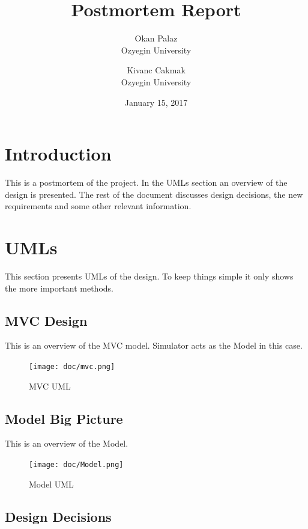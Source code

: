 \documentclass[]{article}
\date{}
\begin{document}
\title{Postmortem Report}
\date{January 15, 2017}
\author{Okan Palaz\\ Ozyegin University \and Kivanc Cakmak \\ Ozyegin University}

\maketitle

\section{Introduction}\label{introduction}

This is a postmortem of the project. In the UMLs section an overview of
the design is presented. The rest of the document discusses design
decisions, the new requirements and some other relevant information.

\section{UMLs}\label{umls}

This section presents UMLs of the design. To keep things simple it only shows
the more important methods.

\subsection{MVC Design}\label{mvc-design}

This is an overview of the MVC model. Simulator acts as the Model in
this case.

\begin{figure}[H]
\centering
\texttt{[image: doc/mvc.png]}
\caption{MVC UML}
\end{figure}

\subsection{Model Big Picture}\label{model-big-picture}

This is an overview of the Model.

\begin{figure}[H]
\centering
\texttt{[image: doc/Model.png]}
\caption{Model UML}
\end{figure}

\subsection{Design Decisions}\label{design-decisions}
\end{document}
